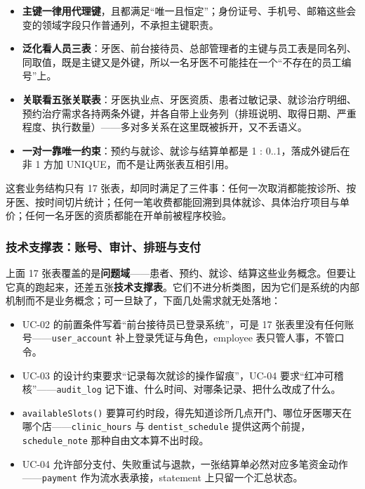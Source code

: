 \documentclass[11pt,a4paper]{ctexart}
\begin{document}
\begin{itemize}[leftmargin=1.8em,topsep=3pt,itemsep=2pt]
  \item \textbf{主键一律用代理键}，且都满足“唯一且恒定”；身份证号、手机号、邮箱这些会变的领域字段只作普通列，不承担主键职责。
  \item \textbf{泛化看人员三表}：牙医、前台接待员、总部管理者的主键与员工表是同名列、同取值，既是主键又是外键，所以一名牙医不可能挂在一个“不存在的员工编号”上。
  \item \textbf{关联看五张关联表}：牙医执业点、牙医资质、患者过敏记录、就诊治疗明细、预约治疗需求各持两条外键，并各自带上业务列（排班说明、取得日期、严重程度、执行数量）——多对多关系在这里既被拆开，又不丢语义。
  \item \textbf{一对一靠唯一约束}：预约与就诊、就诊与结算单都是 1 : 0..1，落成外键后在非 1 方加 UNIQUE，而不是让两张表互相引用。
\end{itemize}

这套业务结构只有 17 张表，却同时满足了三件事：任何一次取消都能按诊所、按牙医、按时间切片统计；任何一笔收费都能回溯到具体就诊、具体治疗项目与单价；任何一名牙医的资质都能在开单前被程序校验。

\subsubsection{技术支撑表：账号、审计、排班与支付}

上面 17 张表覆盖的是\textbf{问题域}——患者、预约、就诊、结算这些业务概念。但要让它真的跑起来，还差五张\textbf{技术支撑表}。它们不进分析类图，因为它们是系统的内部机制而不是业务概念；可一旦缺了，下面几处需求就无处落地：

\begin{itemize}[leftmargin=1.8em,topsep=3pt,itemsep=2pt]
  \item UC-02 的前置条件写着“前台接待员已登录系统”，可是 17 张表里没有任何账号——\texttt{user\_account} 补上登录凭证与角色，employee 表只管人事，不管口令。
  \item UC-03 的设计约束要求“记录每次就诊的操作留痕”，UC-04 要求“红冲可稽核”——\texttt{audit\_log} 记下谁、什么时间、对哪条记录、把什么改成了什么。
  \item \texttt{availableSlots()} 要算可约时段，得先知道诊所几点开门、哪位牙医哪天在哪个店——\texttt{clinic\_hours} 与 \texttt{dentist\_schedule} 提供这两个前提，\texttt{schedule\_note} 那种自由文本算不出时段。
  \item UC-04 允许部分支付、失败重试与退款，一张结算单必然对应多笔资金动作——\texttt{payment} 作为流水表承接，statement 上只留一个汇总状态。
\end{itemize}
\end{document}
